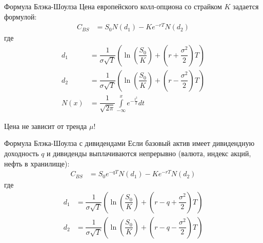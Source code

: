 \documentclass{beamer}
\begin{document}
\begin{frame}{Формула Блэка-Шоулза}
Цена европейского колл-опциона со страйком $K$ задается формулой:
\begin{align*}
C_{BS} &= S_0N(d_1) - Ke^{-rT}N(d_2)
\end{align*}
где
\begin{align*}
d_1 &= \dfrac{1}{\sigma\sqrt{T}}\left( \ln\left(\dfrac{S_0}{K}\right) + \left(r + \dfrac{\sigma^2}{2}\right)T\right) \\
d_2 &= \dfrac{1}{\sigma\sqrt{T}}\left( \ln\left(\dfrac{S_0}{K}\right) + \left(r - \dfrac{\sigma^2}{2}\right)T\right) \\
N(x) &= \dfrac{1}{\sqrt{2\pi}}\int\limits_{-\infty}^x e^{-\frac{t^2}{2}}dt
\end{align*}

\justify
Цена не зависит от тренда $\mu$!
\end{frame}



\begin{frame}{Формула Блэка-Шоулза с дивидендами}
\justify
Если базовый актив имеет дивидендную доходность $q$  и дивиденды выплачиваются непрерывно (валюта, индекс акций, нефть в хранилище):
\begin{align*}
C_{BS} &= S_0e^{-qT}N(d_1) - Ke^{-rT}N(d_2)
\end{align*}
где
\begin{align*}
d_1 &= \dfrac{1}{\sigma\sqrt{T}}\left( \ln\left(\dfrac{S_0}{K}\right) + \left(r -q + \dfrac{\sigma^2}{2}\right)T\right) \\
d_2 &= \dfrac{1}{\sigma\sqrt{T}}\left( \ln\left(\dfrac{S_0}{K}\right) + \left(r -q- \dfrac{\sigma^2}{2}\right)T\right)
\end{align*}
\end{frame}
\end{document}

